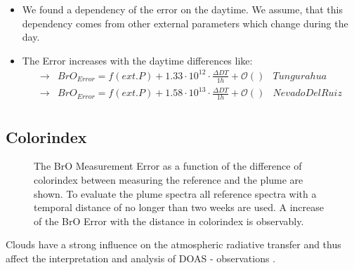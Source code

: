 \documentclass  [
  paper    = a4,
  BCOR     = 10mm,
  twoside,
  fontsize = 12pt,
  fleqn,
  toc      = bibnumbered,
  toc      = listofnumbered,
  numbers  = noendperiod,
  headings = normal,
  listof   = leveldown,
  version  = 3.03
]                                       {scrreprt}
\begin{document}
	\begin{itemize}
		\item We found a dependency of the  error on the daytime. We assume, that this dependency comes from other external parameters which change during the day. 
		\item The  Error increases with the daytime differences like: \\
		\begin{align*}
		\rightarrow&  BrO_{Error} = f(ext. P)+1.33\cdot10^{12}\cdot\frac{\Delta DT}{1h}  + \mathcal{O}\left(\right)& Tungurahua\\
		\rightarrow&  BrO_{Error} = f(ext. P)+1.58\cdot10^{13}\cdot\frac{\Delta DT}{1h} + \mathcal{O}\left(\right) & Nevado Del Ruiz\\
		\end{align*}
		
	\end{itemize}
	\subsection{Colorindex}
	\begin{figure}[h]		
		\caption{The BrO Measurement Error as a function of the difference of colorindex between measuring the reference and the plume are shown. To evaluate the plume spectra all reference spectra with a temporal distance of no longer than two weeks are used. A increase of the BrO Error with the distance in colorindex is observably.}
		\label{fig:diffcolidx}
	\end{figure}
	Clouds  have  a  strong  influence  on  the  atmospheric  radiative  transfer  and  thus  affect  the  interpretation  and  analysis of DOAS - observations \cite{wagner2014cloud}.
	
\end{document}
